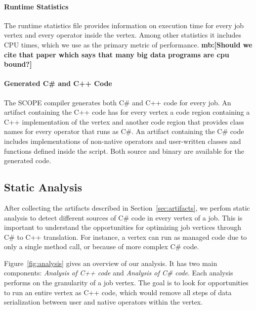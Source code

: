 \paragraph{Runtime Statistics}
The runtime statistics file provides information on execution time for every job vertex and every operator inside the vertex. Among other statistics it includes CPU times, which we use as the primary metric of performance.
{\bf mb:[Should we cite that paper which says that many big data programs are cpu bound?]}



\paragraph{Generated C\# and C++ Code}
The SCOPE compiler generates both C\# and C++ code for every job.
An artifact containing the C++ code has for every vertex a code region containing a C++ implementation of the vertex and another code region that provides class names for every operator that runs as C\#.
An artifact containing the C\# code includes implementations of non-native operators and user-written classes and functions defined inside the script.
Both source and binary are available for the generated code.

\subsection{Static Analysis}

After collecting the artifacts described in Section~\ref{sec:artifacts}, we perfom static analysis to detect different sources of C\# code in every vertex of a job. This is important to understand the opportunities for optimizing job vertices through C\# to C++ translation. For instance, a vertex can run as managed code due to only a single method call, or because of more complex C\# code.

Figure~\ref{fig:analysis} gives an overview of our analysis. It has two main components: \emph{Analysis of C++ code} and \emph{Analysis of C\# code}. Each analysis performs on the granularity of a job vertex. The goal is to look for opportunities to run an entire vertex as C++ code, which would remove all steps of data serialization between user and native operators within the vertex.


